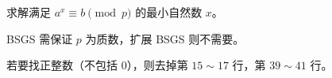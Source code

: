 求解满足 $a^x\equiv b \pmod{p}$ 的最小自然数 $x$。

BSGS 需保证 $p$ 为质数，扩展 BSGS 则不需要。

若要找正整数（不包括 $0$），则去掉第 $15\sim 17$ 行，第 $39\sim 41$ 行。